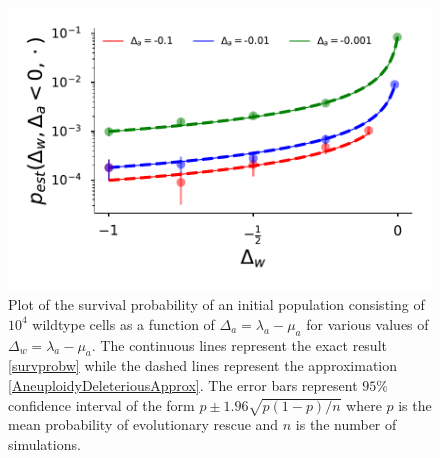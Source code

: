\documentclass[12pt]{extarticle}
\begin{document}
\begin{figure}[!t]
 \vspace*{1\baselineskip}
\includegraphics[width=1\textwidth]{Figures/P_est.pdf}
\caption{Plot of the survival probability of an initial population consisting of $10^{4}$ wildtype cells as a function of $\Delta_a=\lambda_a-\mu_a$ for various values of $\Delta_w=\lambda_a-\mu_a$. The continuous lines represent the exact result \eqref{survprobw} while the dashed lines represent the approximation \eqref{AneuploidyDeleteriousApprox}. The error bars represent $95\%$ confidence interval of the form $p\pm1.96\sqrt{p\left(1-p\right)/n}$ where $p$ is the mean probability of evolutionary rescue and $n$ is the number of simulations.}
\label{P_est}
\end{figure}
\end{document}
